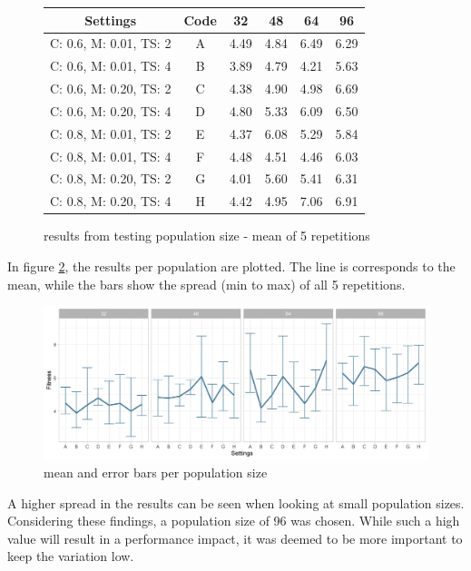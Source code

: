 \begin{figure}[ht]
	\label{tab:pop_settings_results}
	\centering
\begin{tabular}{ c|c|cccc  }
	\hline
	Settings & Code & 32 & 48 & 64 & 96\\
	\hline
	C: 0.6, M: 0.01, TS: 2   	& A & 4.49 & 4.84 & 6.49 & 6.29 \\
	C: 0.6, M: 0.01, TS: 4		& B & 3.89 & 4.79 & 4.21 & 5.63 \\ 
	C: 0.6, M: 0.20, TS: 2 		& C & 4.38 & 4.90 & 4.98 & 6.69 \\
	C: 0.6, M: 0.20, TS: 4    	& D & 4.80 & 5.33 & 6.09 & 6.50 \\
	C: 0.8, M: 0.01, TS: 2   	& E & 4.37 & 6.08 & 5.29 & 5.84 \\
	C: 0.8, M: 0.01, TS: 4		& F & 4.48 & 4.51 & 4.46 & 6.03 \\
	C: 0.8, M: 0.20, TS: 2 		& G & 4.01 & 5.60 & 5.41 & 6.31 \\
	C: 0.8, M: 0.20, TS: 4    	& H & 4.42 & 4.95 & 7.06 & 6.91 \\
	\hline
\end{tabular}
\caption{results from testing population size - mean of 5 repetitions}
\end{figure}


In figure \ref{figure:population:results}, the results per population are plotted. The line is corresponds to the mean, while the bars show the spread (min to max) of all 5 repetitions.
\begin{figure}[ht] 
	\includegraphics[width=1\linewidth]{simulations/population/plots/comparison}
	\caption{mean and error bars per population size}
		\label{figure:population:results}
\end{figure}

A higher spread in the results can be seen when looking at small population sizes. Considering these findings, a population size of 96 was chosen. While such a high value will result in a performance impact, it was deemed to be more important to keep the variation low. 

